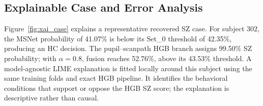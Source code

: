 \documentclass[conference,a4paper]{IEEEtran}
\begin{document}

\subsection{Explainable Case and Error Analysis}

Figure~\ref{fig:xai_case} explains a representative recovered SZ case. For subject 302, the MSNet probability of 41.07\% is below its Set\_0 threshold of 42.35\%, producing an HC decision. The pupil--scanpath HGB branch assigns 99.50\% SZ probability; with $\alpha=0.8$, fusion reaches 52.76\%, above its 43.53\% threshold. A model-agnostic LIME explanation is fitted locally around this subject using the same training folds and exact HGB pipeline. It identifies the behavioral conditions that support or oppose the HGB SZ score; the explanation is descriptive rather than causal.



\end{document}
